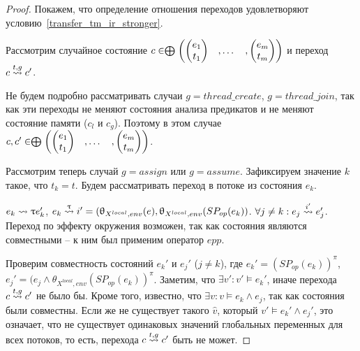 \begin{proof}

Покажем, что определение отношения переходов удовлетворяют условию~\ref{transfer_tm_ir_stronger}. 

Рассмотрим случайное состояние $c \in \mathrel{\bigoplus}
\begin{pmatrix}
\begin{pmatrix}
e_1 \\
t_1 
\end{pmatrix}& ,
\dots& ,
\begin{pmatrix}
e_m \\
t_m 
\end{pmatrix}
\end{pmatrix}$ и переход $c \stackrel{t, g}{\leadsto} c'$.

Не будем подробно рассматривать случаи $g = thread\_create$, $g = thread\_join$, так как эти переходы не меняют состояния анализа предикатов и не меняют состояние памяти ($c_l$ и $c_g$). Поэтому в этом случае $c, c' \in \mathrel{\bigoplus}
\begin{pmatrix}
\begin{pmatrix}
e_1 \\
t_1 
\end{pmatrix}& ,
\dots& ,
\begin{pmatrix}
e_m \\
t_m 
\end{pmatrix}
\end{pmatrix}$.

Рассмотрим теперь случай $g = assign$ или $g = assume$. Зафиксируем значение $k$ такое, что $t_k = t$. Будем рассматривать переход в потоке из состояния $e_k$.

$e_k \leadsto{\uptau} e_k'$, $e_k \stackrel{\uptau}{\leadsto} i' = (\uptheta_{X^{local},env}(e),\uptheta_{X^{local},env}(SP_{op}(e_k))$. 
$\forall j \neq k: e_j \stackrel{i'}{\leadsto} e_j'$.
Переход по эффекту окружения возможен, так как состояния являются совместными -- к ним был применим оператор $epp$.

Проверим совместность состояний $e_k'$ и $e_j'$ ($j \neq k$), где $e_k' = (SP_{op}(e_k))^\pi$, $e_j' = (e_j \land \theta_{X^{local},env}(SP_{op}(e_k))^\pi$. 
Заметим, что $\exists v': v' \models e_k'$, иначе перехода $c \stackrel{t, g}{\leadsto} c'$ не было бы.
Кроме того, известно, что $\exists v: v \models e_k \land e_j$, так как состояния были совместны.
Если же не существует такого $\widehat{v}$, который $v' \models e_k' \land e_j'$, это означает, что не существует одинаковых значений глобальных переменных для всех потоков, то есть, перехода $c \stackrel{t, g}{\leadsto} c'$ быть не может.


\end{proof}
